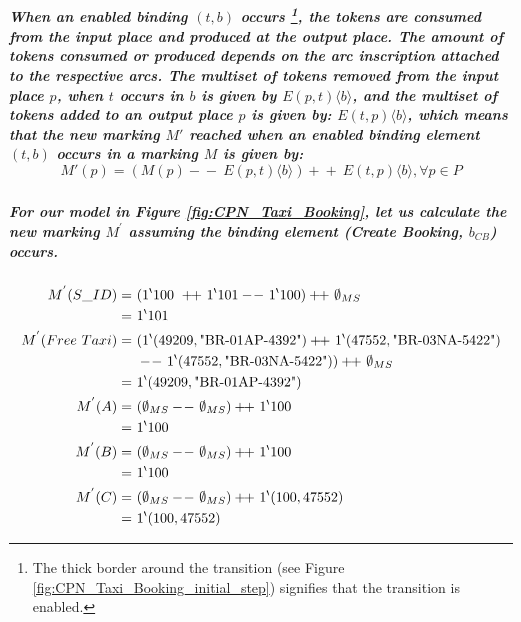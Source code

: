 \subparagraph*{\textnormal{When an enabled binding $\mathit{(t,b)}$ occurs \footnote{The thick border around the transition (see Figure \ref{fig:CPN_Taxi_Booking_initial_step}) signifies that the transition is enabled.}, the tokens are consumed from the input place and produced at the output place. The amount of tokens consumed or produced depends on the arc inscription attached to the respective arcs. The multiset of tokens removed from the input place $\mathit{p}$, when $\mathit{t}$ occurs in $\mathit{b}$ is given by $\mathit{E(p,t)\langle b \rangle}$, and the multiset of tokens added to an output place $\mathit{p}$ is given by: $\mathit{E(t,p)\langle b \rangle}$, which means that the new marking $\mathit{M'}$ reached when an enabled binding element $\mathit{(t,b)}$ occurs in a marking $\mathit{M}$ is given by:
\begin{equation*}
M'(p) = (M(p) -\!-\ E(p, t)\langle b \rangle) +\!\!+\ E(t, p)\langle b \rangle , \forall p \in P
\end{equation*}}}

\subparagraph*{\textnormal{For our model in Figure \ref{fig:CPN_Taxi_Booking}, let us calculate the new marking $M^{'}$ assuming the binding element (\textit{Create Booking, $b_{CB}$}) occurs.}}
\begin{equation*}
\begin{aligned}
M^{'}(S\_ID) =\ & ({1}^{\backprime}100\ +\!\!+\ {1}^{\backprime}101 -\!- \ {1}^{\backprime}100) +\!\!+\ \emptyset_{MS}\\
=\ & {1}^{\backprime}101 \\
M^{'}(Free\ Taxi) =\ & ({1}^{\backprime}(49209,\textnormal{"BR-01AP-4392"}) +\!\!+\ {1}^{\backprime}(47552,\textnormal{"BR-03NA-5422"})\\  
& -\!-\ {1}^{\backprime}(47552,\textnormal{"BR-03NA-5422"})) +\!\!+\ \emptyset_{MS}\\ 
=\ & {1}^{\backprime}(49209,\textnormal{"BR-01AP-4392"})\\ 
M^{'}(A) =\ &(\emptyset_{MS} -\!-\ \emptyset_{MS}) +\!\!+\ {1}^{\backprime}100 \\
=\ &{1}^{\backprime}100\\
M^{'}(B) =\ &(\emptyset_{MS} -\!-\ \emptyset_{MS}) +\!\!+\ {1}^{\backprime}100 \\
=\ &{1}^{\backprime}100\\
M^{'}(C) =\ &(\emptyset_{MS} -\!-\ \emptyset_{MS}) +\!\!+\ {1}^{\backprime}(100,47552)\\
=\ &{1}^{\backprime}(100,47552)
\end{aligned}
\end{equation*}

